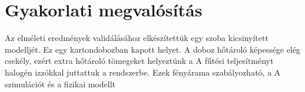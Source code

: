 \chapter{Gyakorlati megvalósítás}

Az elméleti eredmények validálásához elkészítettük egy szoba kicsinyített modelljét. Ez egy kartondobozban kapott helyet. A doboz hőtároló képessége elég csekély, ezért extra hőtároló tömegeket helyeztünk a 
A fűtési teljesítményt halogén izzókkal juttattuk a rendszerbe. Ezek fényárama szabályozható, a 
A szimulációt és a fizikai modellt